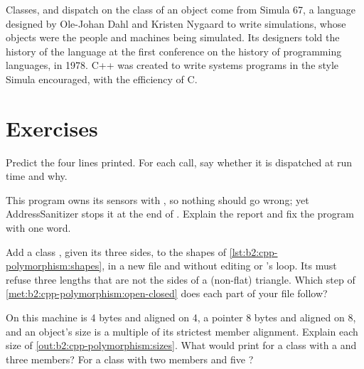 \begin{history}[Simula]
Classes,  and dispatch on the class of an object come from Simula 67, a language designed by Ole-Johan
Dahl and Kristen Nygaard to write simulations, whose objects were the people and machines being simulated. Its
designers told the history of the language at the first conference on the history of programming languages, in
1978. C++ was created to write systems programs in the style Simula encouraged, with the efficiency of C.
\end{history}

\section{Exercises}\label{sec:b2:cpp-polymorphism:exercises}

\begin{exercise}[$\star$]\label{exo:b2:cpp-polymorphism:1}
Predict the four lines printed. For each call, say whether it is dispatched at run time and why.
\end{exercise}

\begin{exercise}[$\star$]\label{exo:b2:cpp-polymorphism:2}
This program owns its sensors with , so nothing should go wrong; yet AddressSanitizer stops it
at the end of . Explain the report and fix the program with one word.
\end{exercise}

\begin{exercise}[$\star$]\label{exo:b2:cpp-polymorphism:3}
Add a class , given its three sides, to the shapes of \cref{lst:b2:cpp-polymorphism:shapes}, in a new
file and without editing  or 's loop. Its  must refuse three lengths
that are not the sides of a (non-flat) triangle. Which step of \cref{met:b2:cpp-polymorphism:open-closed} does each
part of your file follow?
\end{exercise}

\begin{exercise}[$\star$]\label{exo:b2:cpp-polymorphism:4}
On this machine  is 4 bytes and aligned on 4, a pointer 8 bytes and aligned on 8, and an object's size is
a multiple of its strictest member alignment. Explain each size of \cref{out:b2:cpp-polymorphism:sizes}. What would
 print for a class with a  and three  members? For a class with two
 members and five ?
\end{exercise}

